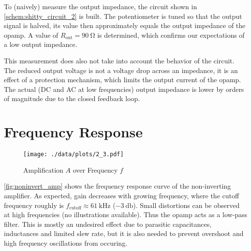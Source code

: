 To (naively) measure the output impedance, the circuit shown in \autoref{schem:shitty_circuit_2} is built.
The potentiometer is tuned so that the output signal is halved, its value then approximately equals the output impedance of the opamp.
A value of $R_\text{out}=\SI{90}{\ohm}$ is determined, which confirms our expectations of a low output impedance.

This measurement does also not take into account the behavior of the circuit.
The reduced output voltage is not a voltage drop across an impedance, it is an effect of a protection mechanism, which limits the output current of the opamp.
The actual (DC and AC at low frequencies) output impedance is lower by orders of magnitude due to the closed feedback loop.

\section{Frequency Response}
\begin{figure}[tbp]
	\centering
	\texttt{[image: ./data/plots/2\_3.pdf]}
	\caption[Frequency Response of Non-Inverting Amplifier]{Amplification $A$ over Frequency $f$}
	\label{fig:noninvert_amp}
\end{figure}

\autoref{fig:noninvert_amp} shows the frequency response curve of the non-inverting amplifier.
As expected, gain decreases with growing frequency, where the cutoff frequency roughly is $f_\text{cutoff}\approx\SI{61}{\kilo\hertz}$ ($\SI{-3}{\decibel}$).
Small distortions can be observed at high frequencies (no illustrations available).
Thus the opamp acts as a low-pass filter.
This is mostly an undesired effect due to parasitic capacitances, inductances and limited slew rate, but it is also needed to prevent overshoot and high frequency oscillations from occuring.
